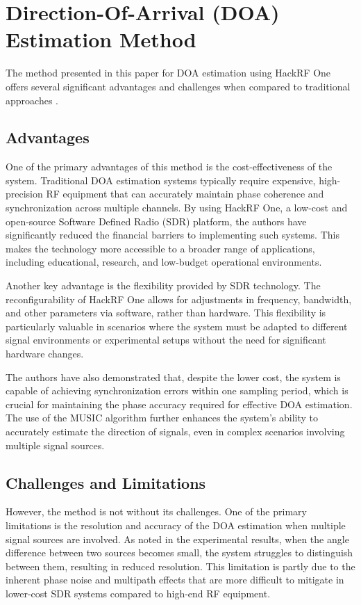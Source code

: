 \documentclass{article}
\begin{document}
\section{Direction-Of-Arrival (DOA) Estimation Method}

The method presented in this paper for DOA estimation using HackRF One offers several significant advantages and challenges when compared to traditional approaches \cite{zhang2022implementation}.

\subsection{Advantages}

One of the primary advantages of this method is the cost-effectiveness of the system. Traditional DOA estimation systems typically require expensive, high-precision RF equipment that can accurately maintain phase coherence and synchronization across multiple channels. By using HackRF One, a low-cost and open-source Software Defined Radio (SDR) platform, the authors have significantly reduced the financial barriers to implementing such systems. This makes the technology more accessible to a broader range of applications, including educational, research, and low-budget operational environments.

Another key advantage is the flexibility provided by SDR technology. The reconfigurability of HackRF One allows for adjustments in frequency, bandwidth, and other parameters via software, rather than hardware. This flexibility is particularly valuable in scenarios where the system must be adapted to different signal environments or experimental setups without the need for significant hardware changes.

The authors have also demonstrated that, despite the lower cost, the system is capable of achieving synchronization errors within one sampling period, which is crucial for maintaining the phase accuracy required for effective DOA estimation. The use of the MUSIC algorithm further enhances the system's ability to accurately estimate the direction of signals, even in complex scenarios involving multiple signal sources.

\subsection{Challenges and Limitations}

However, the method is not without its challenges. One of the primary limitations is the resolution and accuracy of the DOA estimation when multiple signal sources are involved. As noted in the experimental results, when the angle difference between two sources becomes small, the system struggles to distinguish between them, resulting in reduced resolution. This limitation is partly due to the inherent phase noise and multipath effects that are more difficult to mitigate in lower-cost SDR systems compared to high-end RF equipment.
\end{document}
